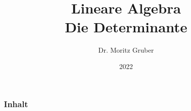 

\title{Lineare Algebra\\[3mm] 
	\large Die Determinante
}
\author{Dr. Moritz Gruber} 
\date{2022}



%
\begin{frame}[plain] 
 \titlepage
\end{frame}
%
%
\begin{frame}\frametitle{Inhalt}
   \tableofcontents
\end{frame}
%
